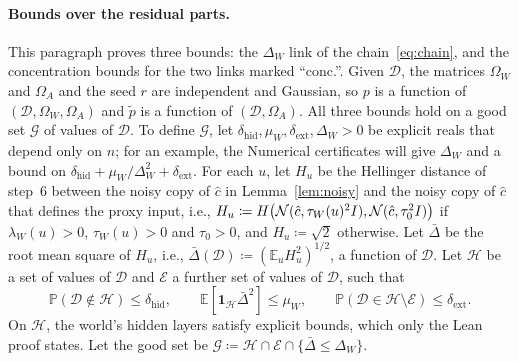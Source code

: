 \documentclass[10pt]{article}
\newcommand{\Dd}{\mathcal{D}}\newcommand{\Ee}{\mathcal{E}}
\newcommand{\Gg}{\mathcal{G}}\newcommand{\Hh}{\mathcal{H}}
\newcommand{\EE}{\mathbb{E}}
\newcommand{\PP}{\mathbb{P}}
\newcommand{\chat}{\hat c}
\begin{document}
\paragraph{Bounds over the residual parts.}
This paragraph proves three bounds: the $\Delta_W$ link of the chain~\eqref{eq:chain}, and
the concentration bounds for the two links marked ``conc.''. Given $\Dd$, the
matrices $\Omega_W$ and $\Omega_A$ and the seed $r$ are independent and
Gaussian, so $p$ is a function of
$(\Dd,\Omega_W,\Omega_A)$ and $\tilde p$ is a function of $(\Dd,\Omega_A)$.
All three bounds hold on a good set $\Gg$ of values of $\Dd$. To define $\Gg$,
let $\delta_{\mathrm{hid}},\mu_W,\delta_{\mathrm{ext}},\Delta_W>0$ be explicit
reals that depend only on $n$; for an example, the Numerical certificates will
give $\Delta_W$ and a bound on $\delta_{\mathrm{hid}}+\mu_W/\Delta_W^2+\delta_{\mathrm{ext}}$. For each $u$, let $H_u$ be the Hellinger distance of step~6 between
the noisy copy of $\chat$ in Lemma~\ref{lem:noisy} and the noisy copy of
$\chat$ that defines the proxy input, i.e.,
$H_u\coloneqq H\bigl(\Nn(\chat,\tau_W(u)^2I),\Nn(\chat,\tau_0^2I)\bigr)$ if
$\lambda_W(u)>0$, $\tau_W(u)>0$ and $\tau_0>0$, and $H_u\coloneqq\sqrt2$
otherwise. Let $\bar\Delta$ be the root mean square of $H_u$, i.e.,
$\bar\Delta(\Dd)\coloneqq(\EE_uH_u^2)^{1/2}$, a function of $\Dd$. Let $\Hh$
be a set of values of $\Dd$ and $\Ee$ a further set of values of $\Dd$, such
that
\[\PP(\Dd\notin\Hh)\le\delta_{\mathrm{hid}},\qquad
\EE[\mathbf 1_{\Hh}\bar\Delta^2]\le\mu_W,\qquad
\PP(\Dd\in\Hh\setminus\Ee)\le\delta_{\mathrm{ext}}.\]
On $\Hh$, the world's hidden layers satisfy explicit bounds, which only the Lean proof states.
Let the good set be $\Gg\coloneqq \Hh\cap\Ee\cap\{\bar\Delta\le\Delta_W\}$.
\end{document}
